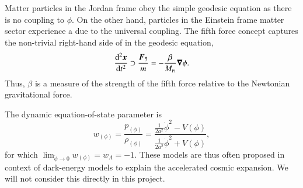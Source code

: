     Matter particles in the Jordan frame obey the simple geodesic equation as there is no coupling to $\phi$. On the other hand, particles in the Einstein frame matter sector experience a  due to the universal coupling. The fifth force concept captures the non-trivial right-hand side of in the geodesic equation, {
    \begin{equation}\label{eq:cosmo:quintessence:framework:fifth_force}
        \dv[2]{\ensuremath{\boldsymbol{x}}}{t} \supset \frac{\boldsymbol{F}_5}{m} = - \frac{\beta}{M_{\text{\tiny{Pl}}}} \boldsymbol{\nabla}\phi.
    \end{equation}}
    Thus, 
    $\beta$ is 
    a measure of the strength of the fifth force relative to the Newtonian gravitational force.  



    The dynamic equation-of-state parameter is 
    \begin{equation}
        w_{(\phi)} =  \frac{p_{(\phi)}}{\rho_{(\phi)}}= \frac{\frac{1}{2a^2} \dot{\phi}^2 - V(\phi) }{\frac{1}{2a^2} \dot{\phi}^2 + V(\phi)},
    \end{equation}
    for which $\lim_{\dot{\phi}\to 0}{w_{(\phi)}}=w_\Lambda = -1$. %
    These models are thus often proposed in context of dark-energy models to explain the accelerated cosmic expansion. We will not consider this directly in this project.





